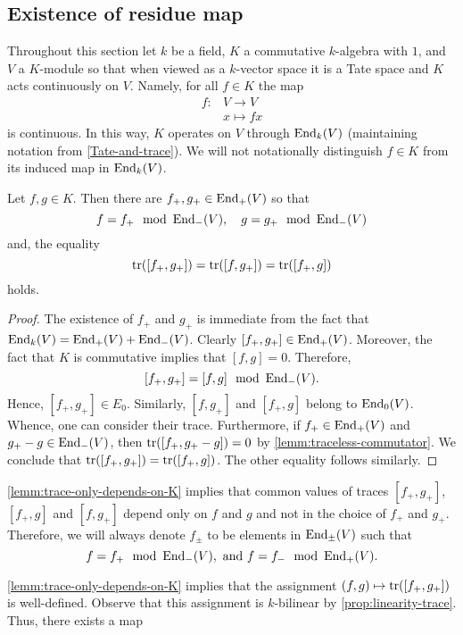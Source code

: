 \subsection{Existence of residue map}
Throughout this section let $k$ be a field, $K$ a commutative $k$-algebra with $1$, and $V$ a $K$-module so that when viewed as a $k$-vector space it is a Tate space and $K$ acts continuously on $V$. Namely, for all $f \in K$ the map 
\begin{align*}
	f\colon &V \to V \\
	&x \mapsto fx 
\end{align*}
is continuous. In this way, $K$ operates on $V$ through $\operatorname{End}_{k}(V)$ (maintaining notation from \cref{Tate-and-trace}). We will not notationally distinguish $f\in K$ from its induced map in $\operatorname{End}_{k}(V)$.
\begin{lemma}\label{lemm:trace-only-depends-on-K}
	Let $f,g \in K$. Then there are $f_{+}, g_{+} \in \operatorname{End}_{+}(V)$ so that 
	\[
	f = f_{+} \mod {\operatorname{End}}_{-}(V) ,\quad g = g_{+} \mod {\operatorname{End}}_{-}(V)
	\]
	and, the equality
	\[
		\operatorname{tr}([f_{+},g_{+}]) = \operatorname{tr}([f, g_{+}]) = \operatorname{tr}([f_{+}, g])
	\]
	holds.
\end{lemma}
\begin{proof}
The existence of $f_{+}$ and $g_{+}$ is immediate from the fact that $\operatorname{End}_{k}(V) = \operatorname{End}_{+}(V) + \operatorname{End}_{-}(V)$.  Clearly $[f_{+},g_{+}]\in \operatorname{End}_{+}(V)$. Moreover, the fact that $K$ is commutative implies that $[f,g] = 0$. Therefore,
\[
	[f_{+},g_{+}] = [f,g] \mod {\operatorname{End}}_{-}(V).
\]
Hence, $[f_{+},g_{+}]\in E_0$. Similarly, $[f,g_{+}]$ and $[f_{+}, g]$ belong to $\operatorname{End}_{0}(V)$. Whence, one can consider their trace. Furthermore, if $f_{+} \in \operatorname{End}_{+}(V)$ and $g_{+} - g \in \operatorname{End}_{-}(V)$, then $\operatorname{tr}([f_{+}, g_{+} - g]) = 0$ by \cref{lemm:traceless-commutator}. We conclude that $\operatorname{tr}([f_{+}, g_{+}]) = \operatorname{tr}([f_{+}, g])$. The other equality follows similarly.
\end{proof}
\begin{notation}\label{not:plus-and-minus}
	\cref{lemm:trace-only-depends-on-K} implies that common values of traces $[f_{+},g_{+}]$, $[f_{+}, g]$ and $[f, g_{+}]$ depend only on $f$ and $g$ and not in the choice of $f_{+}$ and $g_{+}$. Therefore, we will always denote $f_{\pm}$ to be elements in $\operatorname{End}_{\pm}(V)$ such that
	\[
		f = f_{+} \mod {\operatorname{End}}_{-}(V) ,\text{ and } f = f_{-} \mod {\operatorname{End}}_{+}(V).
	\] 
\end{notation}
\cref{lemm:trace-only-depends-on-K} implies that the assignment $(f,g) \mapsto \operatorname{tr}([f_{+}, g_{+}])$  is well-defined. Observe that this assignment is $k$-bilinear by \cref{prop:linearity-trace}. Thus, there exists a map
